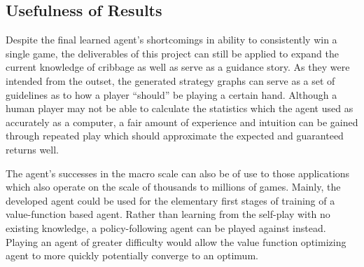 
\subsection{Usefulness of Results}
\label{sec:disc-usefulness}


Despite the final learned agent's shortcomings in ability to consistently win
a single game,
the deliverables of this project can still be applied to expand the current
knowledge of cribbage as well as serve as a guidance story.
%
As they were intended from the outset,
the generated strategy graphs can serve as a set of guidelines as to how a
player ``should'' be playing a certain hand.
%
Although a human player may not be able to calculate the statistics which the
agent used as accurately as a computer,
a fair amount of experience and intuition can be gained through repeated
play which should approximate the expected and guaranteed returns well.

The agent's successes in the macro scale can also be of use to those
applications which also operate on the scale of thousands to millions of games.
%
Mainly,
the developed agent could be used for the elementary first stages of training
of a value-function based agent.
%
Rather than learning from the self-play with no existing knowledge,
a policy-following agent can be played against instead.
%
Playing an agent of greater difficulty would allow the value function optimizing
agent to more quickly potentially converge to an optimum.





%
